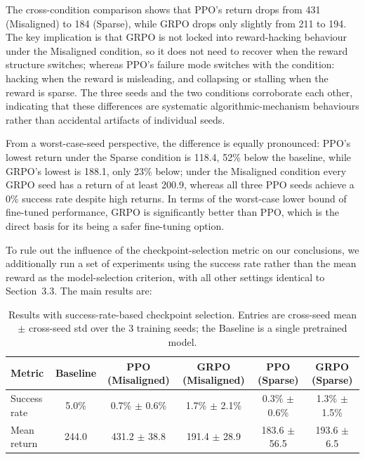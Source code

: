 The cross-condition comparison shows that PPO's return drops from 431 (Misaligned) to 184 (Sparse), while GRPO drops only slightly from 211 to 194. The key implication is that GRPO is not locked into reward-hacking behaviour under the Misaligned condition, so it does not need to recover when the reward structure switches; whereas PPO's failure mode switches with the condition: hacking when the reward is misleading, and collapsing or stalling when the reward is sparse. The three seeds and the two conditions corroborate each other, indicating that these differences are systematic algorithmic-mechanism behaviours rather than accidental artifacts of individual seeds.

From a worst-case-seed perspective, the difference is equally pronounced: PPO's lowest return under the Sparse condition is 118.4, 52\% below the baseline, while GRPO's lowest is 188.1, only 23\% below; under the Misaligned condition every GRPO seed has a return of at least 200.9, whereas all three PPO seeds achieve a 0\% success rate despite high returns. In terms of the worst-case lower bound of fine-tuned performance, GRPO is significantly better than PPO, which is the direct basis for its being a safer fine-tuning option.

To rule out the influence of the checkpoint-selection metric on our conclusions, we additionally run a set of experiments using the success rate rather than the mean reward as the model-selection criterion, with all other settings identical to Section~3.3. The main results are:

\begin{table}[h]
\centering
\begin{tabular}{lccccc}
\hline
Metric & Baseline & PPO (Misaligned) & GRPO (Misaligned) & PPO (Sparse) & GRPO (Sparse) \\
\hline
Success rate & 5.0\% & 0.7\% $\pm$ 0.6\% & 1.7\% $\pm$ 2.1\% & 0.3\% $\pm$ 0.6\% & 1.3\% $\pm$ 1.5\% \\
Mean return & 244.0 & 431.2 $\pm$ 38.8 & 191.4 $\pm$ 28.9 & 183.6 $\pm$ 56.5 & 193.6 $\pm$ 6.5 \\
\hline
\end{tabular}
\caption{Results with success-rate-based checkpoint selection. Entries are cross-seed mean $\pm$ cross-seed std over the 3 training seeds; the Baseline is a single pretrained model.}
\label{tab:bysuccess}
\end{table}

